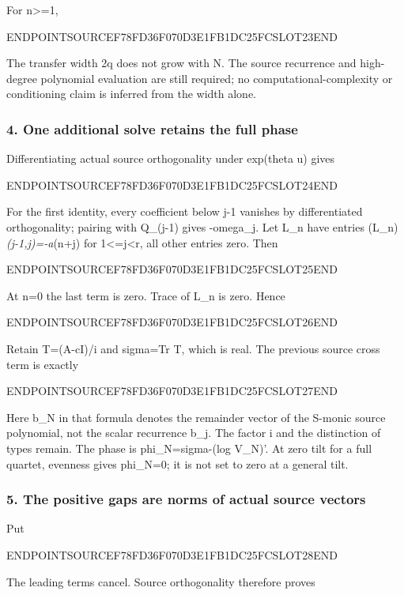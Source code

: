 For n\textgreater=1,

ENDPOINTSOURCEF78FD36F070D3E1FB1DC25FCSLOT23END

The transfer width 2q does not grow with N. The source recurrence and high-degree polynomial evaluation are still required; no computational-complexity or conditioning claim is inferred from the width alone.

\subsubsection{4. One additional solve retains the full phase}\label{endpoint-pr24_current_corrected--one-additional-solve-retains-the-full-phase}

Differentiating actual source orthogonality under exp(theta u) gives

ENDPOINTSOURCEF78FD36F070D3E1FB1DC25FCSLOT24END

For the first identity, every coefficient below j-1 vanishes by differentiated orthogonality; pairing with Q\_(j-1) gives -omega\_j. Let L\_n have entries (L\_n)\emph{(j-1,j)=-a}(n+j) for 1\textless=j\textless r, all other entries zero. Then

ENDPOINTSOURCEF78FD36F070D3E1FB1DC25FCSLOT25END

At n=0 the last term is zero. Trace of L\_n is zero. Hence

ENDPOINTSOURCEF78FD36F070D3E1FB1DC25FCSLOT26END

Retain T=(A-cI)/i and sigma=Tr T, which is real. The previous source cross term is exactly

ENDPOINTSOURCEF78FD36F070D3E1FB1DC25FCSLOT27END

Here b\_N in that formula denotes the remainder vector of the S-monic source polynomial, not the scalar recurrence b\_j. The factor i and the distinction of types remain. The phase is phi\_N=sigma-(log V\_N)'. At zero tilt for a full quartet, evenness gives phi\_N=0; it is not set to zero at a general tilt.

\subsubsection{5. The positive gaps are norms of actual source vectors}\label{endpoint-pr24_current_corrected--the-positive-gaps-are-norms-of-actual-source-vectors}

Put

ENDPOINTSOURCEF78FD36F070D3E1FB1DC25FCSLOT28END

The leading terms cancel. Source orthogonality therefore proves

